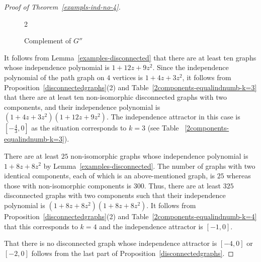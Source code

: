 \documentclass[12pt,a4paper]{article}
\theoremstyle{plain}
\numberwithin{equation}{section}
\begin{document}
\begin{proof}[Proof of Theorem~\ref{exampls-ind-no-4}]
\begin{figure}[h!]
\begin{center}
\begin{multicols}{2}
				\caption{\label{Com G2} Complement of $G''$}	
				
			\end{multicols}	
			
		\end{center}
		
	\end{figure}
It follows from Lemma~\ref{examples-disconnected} that there are at least ten graphs whose independence polynomial is $1+12z+9z^2$. Since the independence polynomial of the path graph on $4$ vertices is $ 1+4z+3z^2$, it follows from  Proposition~\ref{disconnectedgraphs}(2) and  Table~\ref{2components-equalindnumb-k=3}  that there are at least ten non-isomorphic disconnected graphs  with two components, and their independence polynomial is \( (1+4z+3z^2)(1+12z+9z^2) \). The independence attractor in this case is $[-\frac{4}{3},0]$ as the situation corresponds to $k=3$ (see Table ~\ref{2components-equalindnumb-k=3}).
\par
There are at least $25$ non-isomorphic graphs whose independence polynomial is $1+8z +8z^2$ by Lemma~\ref{examples-disconnected}. The number of  graphs with two identical components, each of which is an above-mentioned graph,  is $25$ whereas those with non-isomorphic components is $300$. Thus, there are at least \(325\) disconnected graphs  with two components such that their independence polynomial is \(  (1+8z+8z^2)(1+8z+8z^2) \). It follows from  Proposition~\ref{disconnectedgraphs}(2) and  Table~\ref{2components-equalindnumb-k=4} that this corresponds to $k=4$ and the independence attractor   is $[-1,0]$.
\par
That there is no disconnected graph whose independence attractor is $[-4,0]$ or $[-2,0]$ follows from the last part of Proposition~\ref{disconnectedgraphs}.
\end{proof}
\end{document}
